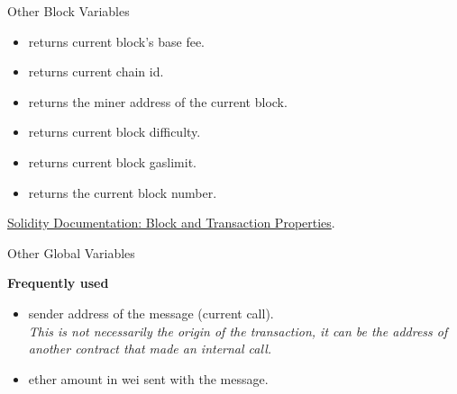 \documentclass[handout]{beamer}
\begin{document}
\begin{frame}{Other Block Variables }

\begin{itemize}
	\item {}  returns current block’s base fee.
	\item {}  returns current chain id.
	\item {}  returns the miner address of the current block.
	\item {}  returns current block difficulty.
	\item {}  returns current block gaslimit.
	\item {} returns the current block number.
\end{itemize}

\vspace{1.5em}

\link \href{https://docs.soliditylang.org/en/v0.8.9/units-and-global-variables.html}{Solidity Documentation: Block and Transaction Properties}.

	
\end{frame}


\begin{frame}{Other Global Variables}

\textbf{Frequently used}
\begin{itemize}
	\item {} sender address of the message (current call).\\
		\textit{This is not necessarily the origin of the transaction, it can be the address of another contract that made an internal call.}
	\item {} ether amount in wei sent with the message.
\end{itemize}

\vspace{0.5em}

	
\end{frame}
\end{document}
